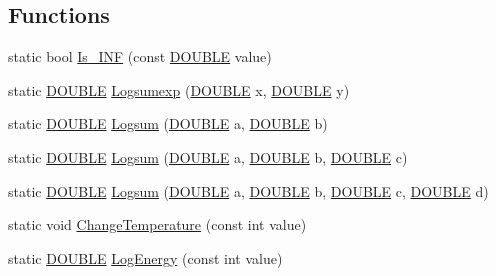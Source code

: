 \subsection*{Functions}
\begin{DoxyCompactItemize}
\item 
static bool \hyperlink{num__operator_8hh_a7faa9ddfccb9193995232f218f89ea11}{Is\+\_\+\+I\+N\+F} (const \hyperlink{energy__const_8hh_a8747af38b86aa2bbcda2f1b1aa0888c2}{D\+O\+U\+B\+L\+E} value)
\item 
static \hyperlink{energy__const_8hh_a8747af38b86aa2bbcda2f1b1aa0888c2}{D\+O\+U\+B\+L\+E} \hyperlink{num__operator_8hh_a5be5e650134b0579fc1dbadd92e5f5ce}{Logsumexp} (\hyperlink{energy__const_8hh_a8747af38b86aa2bbcda2f1b1aa0888c2}{D\+O\+U\+B\+L\+E} x, \hyperlink{energy__const_8hh_a8747af38b86aa2bbcda2f1b1aa0888c2}{D\+O\+U\+B\+L\+E} y)
\item 
static \hyperlink{energy__const_8hh_a8747af38b86aa2bbcda2f1b1aa0888c2}{D\+O\+U\+B\+L\+E} \hyperlink{num__operator_8hh_ad1af57446b0c2dca5c1ac288055a4dc2}{Logsum} (\hyperlink{energy__const_8hh_a8747af38b86aa2bbcda2f1b1aa0888c2}{D\+O\+U\+B\+L\+E} a, \hyperlink{energy__const_8hh_a8747af38b86aa2bbcda2f1b1aa0888c2}{D\+O\+U\+B\+L\+E} b)
\item 
static \hyperlink{energy__const_8hh_a8747af38b86aa2bbcda2f1b1aa0888c2}{D\+O\+U\+B\+L\+E} \hyperlink{num__operator_8hh_a11f35c52d29c7099bc6964b43b17b281}{Logsum} (\hyperlink{energy__const_8hh_a8747af38b86aa2bbcda2f1b1aa0888c2}{D\+O\+U\+B\+L\+E} a, \hyperlink{energy__const_8hh_a8747af38b86aa2bbcda2f1b1aa0888c2}{D\+O\+U\+B\+L\+E} b, \hyperlink{energy__const_8hh_a8747af38b86aa2bbcda2f1b1aa0888c2}{D\+O\+U\+B\+L\+E} c)
\item 
static \hyperlink{energy__const_8hh_a8747af38b86aa2bbcda2f1b1aa0888c2}{D\+O\+U\+B\+L\+E} \hyperlink{num__operator_8hh_ab6915c34e4363a0bf706745e1d6c5acd}{Logsum} (\hyperlink{energy__const_8hh_a8747af38b86aa2bbcda2f1b1aa0888c2}{D\+O\+U\+B\+L\+E} a, \hyperlink{energy__const_8hh_a8747af38b86aa2bbcda2f1b1aa0888c2}{D\+O\+U\+B\+L\+E} b, \hyperlink{energy__const_8hh_a8747af38b86aa2bbcda2f1b1aa0888c2}{D\+O\+U\+B\+L\+E} c, \hyperlink{energy__const_8hh_a8747af38b86aa2bbcda2f1b1aa0888c2}{D\+O\+U\+B\+L\+E} d)
\item 
static void \hyperlink{num__operator_8hh_ab4a68ddf8c09397ded6e38315289241f}{Change\+Temperature} (const int value)
\item 
static \hyperlink{energy__const_8hh_a8747af38b86aa2bbcda2f1b1aa0888c2}{D\+O\+U\+B\+L\+E} \hyperlink{num__operator_8hh_a590275b84bd71f97ca6c2dc854d90d7f}{Log\+Energy} (const int value)

\end{DoxyCompactItemize}

